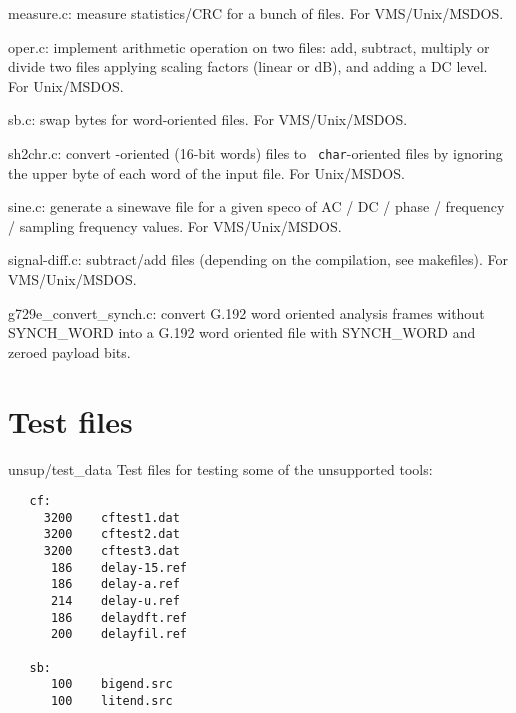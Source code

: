 \begin{Descr}{40mm}
\item[measure.c:]
        measure statistics/CRC for a bunch of files.  For
        VMS/Unix/MSDOS.

\item[oper.c:]
            implement arithmetic operation on two files: add,
            subtract, multiply or divide two files applying
            scaling factors (linear or dB), and adding a DC
            level. For Unix/MSDOS.

\item[sb.c:]
        swap bytes for word-oriented files. For
        VMS/Unix/MSDOS.

\item[sh2chr.c:]
           convert \short-oriented (16-bit words) files to {\tt
           char}-oriented files by ignoring the upper byte of each
           word of the input file. For Unix/MSDOS.

\item[sine.c:]
        generate a sinewave file for a given speco of AC / DC / phase / frequency / sampling frequency values.
        For VMS/Unix/MSDOS.

\item[signal-diff.c:]
        subtract/add files (depending on the compilation, see makefiles). For VMS/Unix/MSDOS.


\item[g729e\_convert\_synch.c:]
        convert G.192 word oriented analysis 
        frames without SYNCH\_WORD into a G.192 word oriented 
        file with SYNCH\_WORD and zeroed payload bits. 
         
\end{Descr}


\section{Test files}

\begin{Descr}{40mm}
\item[unsup/test\_data]
Test files for testing some of the unsupported tools: \\
    {\tt\begin{verbatim}
   cf:
     3200    cftest1.dat
     3200    cftest2.dat
     3200    cftest3.dat
      186    delay-15.ref
      186    delay-a.ref
      214    delay-u.ref
      186    delaydft.ref
      200    delayfil.ref

   sb:
      100    bigend.src
      100    litend.src

        \end{verbatim}}
\end{Descr}
